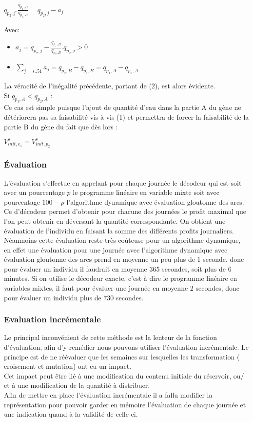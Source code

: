 \documentclass[a4paper]{report}
\begin{document}
 \begin{center}
 $q_{p_{2},j}.\frac{q_{p_{1},B}}{q_{p_{2},B}}= q_{p_{2},j}-a_{j}$
 \end{center}
 Avec:
 \begin{itemize}
 \item $a_{j}= q_{p_{2},j}- \frac{q_{p_{1},B}}{q_{p_{2},B}}. q_{p_{2},j}>0$
 \item$\sum_{j=s..51}a_{j}=q_{p_{2},B}-q_{p_{1},B}= q_{p_{1},A}-q_{p_{2},A}$
 \end{itemize}
 La véracité de l'inégalité précédente, partant de (2), est alors évidente.\\
  Si $q_{p_{1},A}<q_{p_{2},A}$ :\\
  Ce cas est simple puisque l'ajout de quantité d'eau dans la partie A du gène ne détériorera pas sa faisabilité vis à vis (1) et permettra de forcer la faisabilité de la partie  B du gène du fait que  dès lors :\\
  \begin{center}
  $V_{init,e_{1}}^{s}=V_{init,p_{2}}^{s}$
  \end{center}
\subsubsection{Évaluation}
L'évaluation s'effectue en appelant pour chaque journée le décodeur qui est soit avec un pourcentage $p$ le programme linéaire en variable mixte soit avec pourcentage $100-p$ l'algorithme dynamique avec évaluation gloutonne des arcs. Ce d'décodeur permet d'obtenir pour chacune des journées le profit maximal que l'on peut obtenir en déversant la quantité correspondante. On obtient une évaluation de l'individu en faisant la somme des différents profits journaliers.\\
Néanmoins cette évaluation reste très coûteuse pour un algorithme dynamique, en effet une évaluation pour une journée avec l'algorithme dynamique avec évaluation gloutonne des arcs prend en moyenne un peu plus de 1 seconde, donc pour évaluer un individu il faudrait en moyenne 365 secondes, soit plus de 6 minutes. Si on utilise le décodeur exacte, c'est à dire le programme linéaire en variables mixtes, il faut pour évaluer une journée en moyenne 2 secondes, donc pour évaluer un individu plus de 730 secondes.
\subsubsection{Evaluation incrémentale}
Le principal inconvénient de cette méthode est la lenteur de la fonction d'évaluation, afin d'y remédier nous pouvons utiliser l'évaluation incrémentale.  Le principe est de ne réévaluer que les semaines sur lesquelles les transformation ( croisement et mutation) ont eu un impact. \\
Cet impact peut être lié à une modification du contenu initiale du réservoir, ou/ et à une modification de la quantité à distribuer.\\
Afin de mettre en place l'évaluation incrémentale il a fallu modifier la représentation pour pouvoir garder en mémoire l'évaluation de chaque journée et une indication quand à la validité de celle ci.
\end{document}
